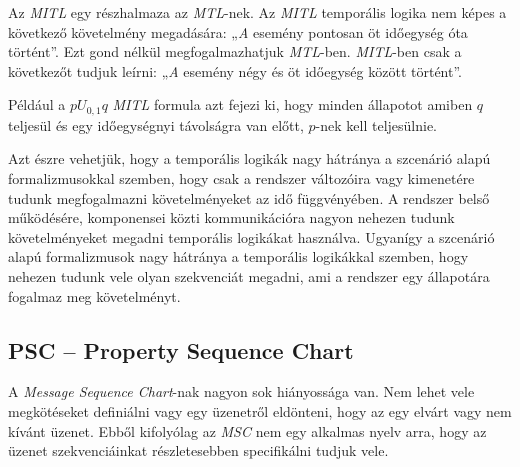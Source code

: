 Az \textit{MITL} egy részhalmaza az \textit{MTL}-nek.
Az \textit{MITL} temporális logika nem képes a következő követelmény megadására: „\textit{A} esemény pontosan öt időegység óta történt”.
Ezt gond nélkül megfogalmazhatjuk \textit{MTL}-ben.
\textit{MITL}-ben csak a következőt tudjuk leírni: „\textit{A} esemény négy és öt időegység között történt”.

Például a $p U_{0,1} q$ \textit{MITL} formula azt fejezi ki, hogy minden állapotot amiben $q$ teljesül és egy időegységnyi távolságra van előtt, $p$-nek kell teljesülnie.

Azt észre vehetjük, hogy a temporális logikák nagy hátránya a szcenárió alapú formalizmusokkal szemben, hogy csak a rendszer változóira vagy kimenetére tudunk megfogalmazni követelményeket az idő függvényében.
A rendszer belső működésére, komponensei közti kommunikációra nagyon nehezen tudunk követelményeket megadni temporális logikákat használva.
Ugyanígy a szcenárió alapú formalizmusok nagy hátránya a temporális logikákkal szemben, hogy nehezen tudunk vele olyan szekvenciát megadni, ami a rendszer egy állapotára fogalmaz meg követelményt.

\subsection{PSC – Property Sequence Chart}
A \textit{Message Sequence Chart}-nak nagyon sok hiányossága van.
Nem lehet vele megkötéseket definiálni vagy egy üzenetről eldönteni, hogy az egy elvárt vagy nem kívánt üzenet.
Ebből kifolyólag az \textit{MSC} nem egy alkalmas nyelv arra, hogy az üzenet szekvenciáinkat részletesebben specifikálni tudjuk vele.

